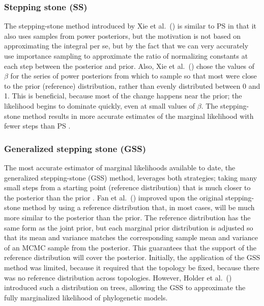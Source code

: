 \subsubsection{Stepping stone (SS)}
The stepping-stone method introduced by Xie et al.\ (\citeyear{Xie2011})
is similar to PS in that it also uses samples from power posteriors, but the
motivation is not based on approximating the integral per se, but by
the fact that we can very accurately use importance sampling to approximate the
ratio of normalizing constants at each step between the posterior and prior.
Also, Xie et al.\ (\citeyear{Xie2011}) chose the values of $\beta$ for the
series of power posteriors from which to sample so that most were close to
the prior (reference) distribution, rather than evenly distributed between
0 and 1.
This is beneficial, because most of the change happens near the prior; the
likelihood begins to dominate quickly, even at small values of $\beta$.
The stepping-stone method results in more accurate estimates of the marginal
likelihood with fewer steps than PS \citep{Xie2011}.

\subsubsection{Generalized stepping stone (GSS)}
The most accurate estimator of marginal likelihoods available to date, the
generalized stepping-stone (GSS) method, leverages both strategies; taking many
small steps from a starting point (reference distribution) that is much closer
to the posterior than the prior \citep{Fan2011}.
Fan et al.\ (\citeyear{Fan2011}) improved upon the original stepping-stone
method by using a reference distribution that, in most cases, will be much more
similar to the posterior than the prior.
The reference distribution has the same form as the joint prior, but each
marginal prior distribution is adjusted so that its mean and variance matches
the corresponding sample mean and variance of an MCMC sample from the
posterior.
This guarantees that the support of the reference distribution will cover the
posterior.
Initially, the application of the GSS method was limited, because it required
that the topology be fixed, because there was no reference distribution across
topologies.
However, Holder et al.\ (\citeyear{Holder2014}) introduced such a distribution
on trees, allowing the GSS to approximate the fully marginalized likelihood of
phylogenetic models.

